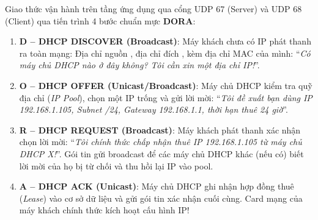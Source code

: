 Giao thức  vận hành trên tầng ứng dụng qua cổng UDP 67 (Server) và UDP 68 (Client) qua tiến trình 4 bước chuẩn mực \textbf{DORA}:
\begin{enumerate}
  \item \textbf{D -- DHCP DISCOVER (Broadcast)}: Máy khách chưa có IP phát thanh ra toàn mạng: Địa chỉ nguồn , địa chỉ đích , kèm địa chỉ MAC của mình: ``\textit{Có máy chủ DHCP nào ở đây không? Tôi cần xin một địa chỉ IP!}''.
  \item \textbf{O -- DHCP OFFER (Unicast/Broadcast)}: Máy chủ DHCP kiểm tra quỹ địa chỉ (\textit{IP Pool}), chọn một IP trống và gửi lời mời: ``\textit{Tôi đề xuất bạn dùng IP 192.168.1.105, Subnet /24, Gateway 192.168.1.1, thời hạn thuê 24 giờ}''.
  \item \textbf{R -- DHCP REQUEST (Broadcast)}: Máy khách phát thanh xác nhận chọn lời mời: ``\textit{Tôi chính thức chấp nhận thuê IP 192.168.1.105 từ máy chủ DHCP X!}''. Gói tin gửi broadcast để các máy chủ DHCP khác (nếu có) biết lời mời của họ bị từ chối và thu hồi lại IP vào pool.
  \item \textbf{A -- DHCP ACK (Unicast)}: Máy chủ DHCP ghi nhận hợp đồng thuê (\textit{Lease}) vào cơ sở dữ liệu và gửi gói tin xác nhận cuối cùng. Card mạng của máy khách chính thức kích hoạt cấu hình IP!
\end{enumerate}

